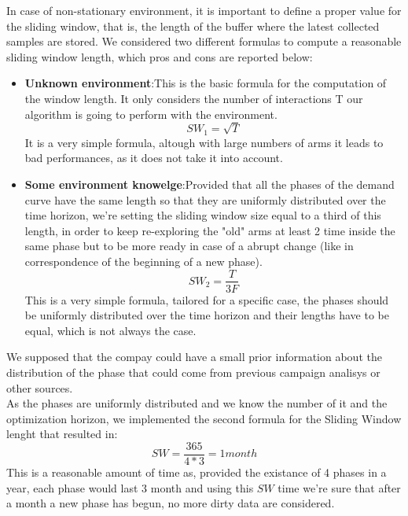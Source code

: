 In case of non-stationary environment, it is important to define a
proper value for the sliding window, that is, the length of the buffer where the latest
collected samples are stored. We considered two different formulas to compute a
reasonable sliding window length, which pros and cons are reported below:

\begin{itemize}
	\item \textbf{Unknown environment}:\@  This is the basic formula for the computation of the window length. It only considers the number of interactions T our algorithm is going to perform
	with the environment.
	$$SW_1 = \sqrt{T}$$
	It is a very simple formula, altough with large numbers of arms it leads to bad performances, as it does not take it into account.
	
	\item \textbf{Some environment knowelge}:\@  Provided that all the phases of the demand curve have the same length so that they are uniformly distributed over the time horizon, we’re setting the sliding window size equal to a third of this length, in 	order to keep re-exploring the "old" arms at least 2 time inside the same phase but to be more ready in case of a abrupt change (like in correspondence of the beginning
	of a new phase).
	$$SW_2 = \dfrac{T}{3F}$$
	This is a very simple formula, tailored for a specific case, the phases should be uniformly distributed over the time horizon
	and their lengths have to be equal, which is not always the case.	
\end{itemize} 

We supposed that the compay could have a small prior information about the distribution of the phase that could come from previous campaign analisys or other sources.
\\As the phases are uniformly distributed and we know the number of it and the optimization horizon, we implemented the second formula for the Sliding Window lenght that resulted in:
$$SW = \dfrac{365}{4*3} = 1 month$$
This is a reasonable amount of time as, provided the existance of 4 phases in a year, each phase would last 3 month and using this $SW$ time we're sure that after a month a new phase has begun, no more dirty data are considered.